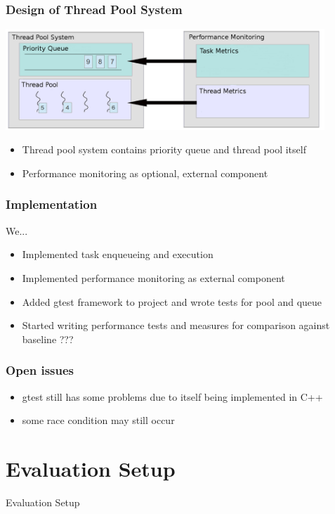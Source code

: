 \documentclass{beamer}
\begin{document}
\begin{frame}
	\frametitle{Design of Thread Pool System}
	\begin{center}
		\includegraphics[width=0.9\textwidth]{img/pool_structure.png}
	\end{center}
	\begin{itemize}
		\item Thread pool system contains priority queue and thread pool itself
		\item Performance monitoring as optional, external component
	\end{itemize}
\end{frame}

\begin{frame}
	\frametitle{Implementation}
	We...
	\begin{itemize}
		\item Implemented task enqueueing and execution
		\item Implemented performance monitoring as external component
		\item Added gtest framework to project and wrote tests for pool and queue
		\item Started writing performance tests and measures for comparison against baseline ???
	\end{itemize}
\end{frame}

\begin{frame}
	\frametitle{Open issues}
	\begin{itemize}
		\item gtest still has some problems due to itself being implemented in C++
		\item some race condition may still occur
	\end{itemize}
\end{frame}

\section{Evaluation Setup}
\begin{frame}
	\begin{center}
		\huge Evaluation Setup
	\end{center}
\end{frame}
\end{document}
